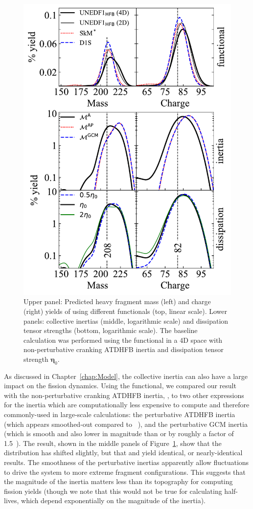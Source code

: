 \begin{figure}
	\centering
	\includegraphics[width=0.7\linewidth]{TeX_files/294Og_compare_all}
	\caption[$^{294}$Og heavy fragment masses and charges.]{Upper panel: Predicted heavy fragment mass (left) and charge (right) yields of \Og{} using different functionals (top, linear scale). Lower panels: collective inertias (middle, logarithmic scale) and dissipation tensor strengths (bottom, logarithmic scale). The baseline calculation was performed using the \hfb{} functional in a 4D space with non-perturbative cranking ATDHFB inertia and dissipation tensor strength $\mathbf{\eta}_0$.}
	\label{fig:294ogcompareall}
\end{figure}

As discussed in Chapter~\ref{chap:Model}, the collective inertia can also have a large impact on the fission dynamics. Using the {\hfb} functional, we compared our result with the non-perturbative cranking ATDHFB inertia, {\MATDHF}, to two other expressions for the inertia which are computationally less expensive to compute and therefore commonly-used in large-scale calculations: the perturbative ATDHFB inertia {\MATDHFp} (which appears smoothed-out compared to {\MATDHF}~\cite{giuliani2018b}), and the perturbative GCM inertia {\MGCMp} (which is smooth and also lower in magnitude than {\MATDHF} or {\MATDHFp} by roughly a factor of 1.5~\cite{giuliani2018b}). The result, shown in the middle panels of Figure~\ref{fig:294ogcompareall}, show that the distribution has shifted slightly, but that {\MATDHFp} and {\MGCMp} yield identical, or nearly-identical results. The smoothness of the perturbative inertias apparently allow fluctuations to drive the system to more extreme fragment configurations. This suggests that the magnitude of the inertia matters less than its topography for computing fission yields (though we note that this would not be true for calculating half-lives, which depend exponentially on the magnitude of the inertia).

